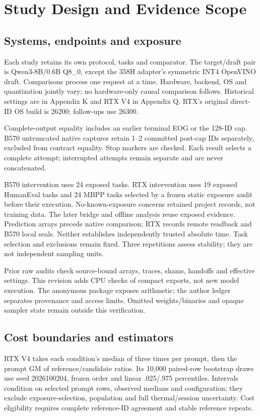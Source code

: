 \section{Study Design and Evidence Scope}
\label{sec:methods}
\subsection{Systems, endpoints and exposure}
Each study retains its own protocol, tasks and comparator. The target/draft pair is Qwen3-8B/0.6B Q8\_0, except the 358H adapter's symmetric INT4 OpenVINO draft. Comparisons process one request at a time. Hardware, backend, OS and quantization jointly vary; no hardware-only causal comparison follows. Historical settings are in Appendix K and RTX V4 in Appendix Q. RTX's original direct-ID OS build is 26200; follow-ups use 26300.

Complete-output equality includes an earlier terminal EOG or the 128-ID cap. B570 untruncated native captures retain 1--2 committed post-cap IDs separately, excluded from contract equality. Stop markers are checked. Each result selects a complete attempt; interrupted attempts remain separate and are never concatenated.

B570 intervention uses 24 exposed tasks. RTX intervention uses 19 exposed HumanEval tasks and 24 MBPP tasks selected by a frozen static exposure audit before their execution. No-known-exposure concerns retained project records, not training data. The later bridge and offline analysis reuse exposed evidence. Prediction arrays precede native comparison; RTX records remote readback and B570 local seals. Neither establishes independently trusted absolute time. Task selection and exclusions remain fixed. Three repetitions assess stability; they are not independent sampling units.

Prior raw audits check source-bound arrays, traces, shams, handoffs and effective settings. This revision adds CPU checks of compact exports, not new model execution. The anonymous package exposes arithmetic; the author ledger separates provenance and access limits. Omitted weights/binaries and opaque sampler state remain outside this verification.

\subsection{Cost boundaries and estimators}
RTX V4 takes each condition's median of three times per prompt, then the prompt GM of reference/candidate ratios. Its 10,000 paired-row bootstrap draws use seed 2026100204, frozen order and linear .025/.975 percentiles. Intervals condition on selected prompt rows, observed medians and configuration; they exclude exposure-selection, population and full thermal/session uncertainty. Cost eligibility requires complete reference-ID agreement and stable reference repeats.

